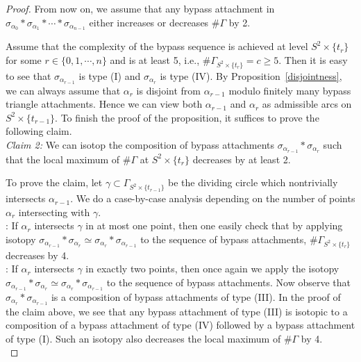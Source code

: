 \documentclass[12pt]{amsart}
\theoremstyle{remark}
\begin{document}
\begin{proof}
From now on, we assume that any bypass attachment in $\sigma_{\alpha_0} \ast \sigma_{\alpha_1} \ast\cdots\ast \sigma_{\alpha_{n-1}}$ either increases or decreases $\#\Gamma$ by 2.

Assume that the complexity of the bypass sequence is achieved at level $S^2\times\{t_r\}$ for some $r\in\{0,1,\cdots,n\}$ and is at least 5, i.e., $\#\Gamma_{S^2\times\{t_r\}}=c\geq5$. Then it is easy to see that $\sigma_{\alpha_{r-1}}$ is type (I) and $\sigma_{\alpha_r}$ is type (IV). By Proposition~\ref{disjointness}, we can always assume that $\alpha_r$ is disjoint from $\alpha_{r-1}$ modulo finitely many bypass triangle attachments. Hence we can view both $\alpha_{r-1}$ and $\alpha_r$ as admissible arcs on $S^2\times\{t_{r-1}\}$. To finish the proof of the proposition, it suffices to prove the following claim. \\

\noindent
{\em Claim 2:} We can isotop the composition of bypass attachments $\sigma_{\alpha_{r-1}}\ast\sigma_{\alpha_r}$ such that the local maximum of $\#\Gamma$ at $S^2\times\{t_r\}$ decreases by at least 2.

To prove the claim, let $\gamma\subset\Gamma_{S^2\times\{t_{r-1}\}}$ be the dividing circle which nontrivially intersects $\alpha_{r-1}$. We do a case-by-case analysis depending on the number of points $\alpha_r$ intersecting with $\gamma$. \\

: If $\alpha_r$ intersects $\gamma$ in at most one point, then one easily check that by applying isotopy $\sigma_{\alpha_{r-1}}\ast\sigma_{\alpha_r} \simeq \sigma_{\alpha_r}\ast\sigma_{\alpha_{r-1}}$ to the sequence of bypass attachments, $\#\Gamma_{S^2\times\{t_r\}}$ decreases by 4. \\

: If $\alpha_r$ intersects $\gamma$ in exactly two points, then once again we apply the isotopy $\sigma_{\alpha_{r-1}}\ast\sigma_{\alpha_r} \simeq \sigma_{\alpha_r}\ast\sigma_{\alpha_{r-1}}$ to the sequence of bypass attachments. Now observe that $\sigma_{\alpha_r}\ast\sigma_{\alpha_{r-1}}$ is a composition of bypass attachments of type (III). In the proof of the claim above, we see that any bypass attachment of type (III) is isotopic to a composition of a bypass attachment of type (IV) followed by a bypass attachment of type (I). Such an isotopy also decreases the local maximum of $\#\Gamma$ by 4. \\


\end{proof}
\end{document}
